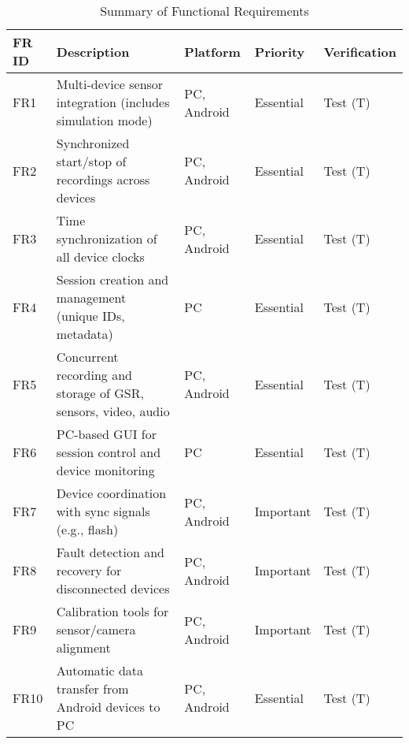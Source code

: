 \begin{table}[h!]
    \centering
    \caption{Summary of Functional Requirements}
    \label{tab:fr_summary}
    \begin{tabular}{@{}lllll@{}}
        \toprule
        \textbf{FR ID} & \textbf{Description}                                           & \textbf{Platform} & \textbf{Priority} & \textbf{Verification} \\ \midrule
        FR1            & Multi-device sensor integration (includes simulation mode)     & PC, Android       & Essential & Test (T) \\
        FR2            & Synchronized start/stop of recordings across devices           & PC, Android       & Essential         & Test (T)              \\
        FR3            & Time synchronization of all device clocks                      & PC, Android       & Essential         & Test (T)              \\
        FR4            & Session creation and management (unique IDs, metadata)         & PC                & Essential         & Test (T)              \\
        FR5            & Concurrent recording and storage of GSR, sensors, video, audio & PC, Android       & Essential & Test (T) \\
        FR6            & PC-based GUI for session control and device monitoring         & PC                & Essential         & Test (T)              \\
        FR7            & Device coordination with sync signals (e.g., flash)             & PC, Android       & Important         & Test (T)              \\
        FR8            & Fault detection and recovery for disconnected devices          & PC, Android       & Important         & Test (T)              \\
        FR9            & Calibration tools for sensor/camera alignment                  & PC, Android       & Important         & Test (T)              \\
        FR10           & Automatic data transfer from Android devices to PC             & PC, Android       & Essential         & Test (T)              \\ \bottomrule
    \end{tabular}
\end{table}
